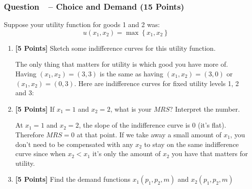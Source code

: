 \documentclass[12pt]{article}
\newcounter{question}[section]
\newcommand{\question}[1]{\refstepcounter{question}
  \subsubsection*{Question~\thequestion~-- #1}}
\newenvironment{subquestions}{
  \begin{enumerate}[label=(\roman*)]}{\end{enumerate}}
\begin{document}
\question{Choice and Demand (15 Points)}
Suppose your utility function for goods 1 and 2 was:
\[
  u\left( x_1,x_2 \right)=\max\left\{ x_1,x_2 \right\}
\]
\begin{subquestions}
  \item \textbf{[5 Points]} Sketch some indifference curves for this utility function.

    \textcolor{solution-color}{
      The only thing that matters for utility is which good you have more of.
      Having $\left( x_1,x_2 \right)=\left( 3,3 \right)$ is the same as having
      $\left( x_1,x_2 \right)=\left( 3,0 \right)$ or $\left( x_1,x_2
      \right)=\left( 0,3 \right)$. Here are indifference curves for fixed
      utility levels 1, 2 and 3:
       \begin{center}
       \end{center}
    }
  \item \textbf{[5 Points]} If $x_1=1$ and $x_2=2$, what is your $MRS$? Interpret the number.

    \textcolor{solution-color}{
      At $x_1=1$ and $x_2=2$, the slope of the indifference curve is 0 (it's
      flat). Therefore $MRS=0$ at that point. If we take away a small amount of
      $x_1$, you don't need to be compensated with any $x_2$ to stay on the
      same indifference curve since when $x_2<x_1$ it's only the amount of
      $x_2$ you have that matters for utility.
    }
  \item \textbf{[5 Points]} Find the demand functions $x_1\left( p_1,p_2,m \right)$ and $x_2\left(
    p_1,p_2, m\right)$


\end{subquestions}
\end{document}
